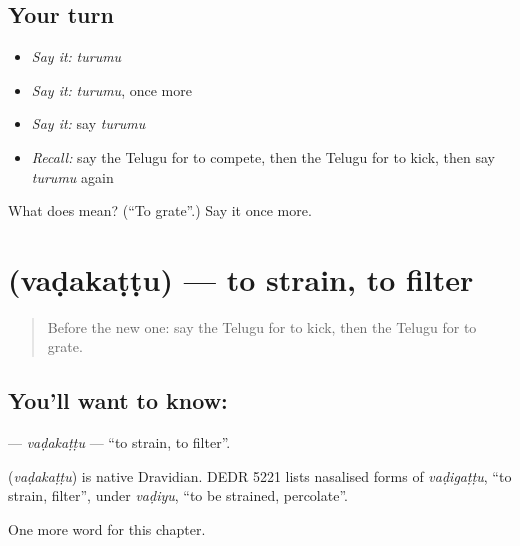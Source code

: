 \subsection*{Your turn}
\begin{itemize}
\raggedright
  \item \emph{Say it:} \emph{turumu}
  \item \emph{Say it:} \emph{turumu}, once more
  \item \emph{Say it:} say \emph{turumu}
  \item \emph{Recall:} say the Telugu for to compete, then the Telugu for to kick, then say \emph{turumu} again
\end{itemize}

\begin{tcolorbox}[breakable,colback=teal!4,colframe=teal!35!black,title={Before you move on}]
What does  mean? (\textquotedblleft{}To grate\textquotedblright{}.) Say it once more.
\end{tcolorbox}
\section[\texorpdfstring{\te{వడకట్టు} (vaḍakaṭṭu)}{వడకట్టు (vaḍakaṭṭu)}]{ (vaḍakaṭṭu) — to strain, to filter}

\label{lesson:TE-C164-vadakattu}



\begin{quote}
Before the new one: say the Telugu for to kick, then the Telugu for to grate.
\end{quote}

\subsection*{You'll want to know: }
\textbf{} — \emph{vaḍakaṭṭu} — \textquotedblleft{}to strain, to filter\textquotedblright{}.

\begin{cousinweb}
\textbf{} (\emph{vaḍakaṭṭu}) is native Dravidian. DEDR 5221 lists nasalised forms of \emph{vaḍigaṭṭu}, \textquotedblleft{}to strain, filter\textquotedblright{}, under \emph{vaḍiyu}, \textquotedblleft{}to be strained, percolate\textquotedblright{}.
\end{cousinweb}

\begin{grammarlens}[title={What you've built}]
One more word for this chapter.
\end{grammarlens}

